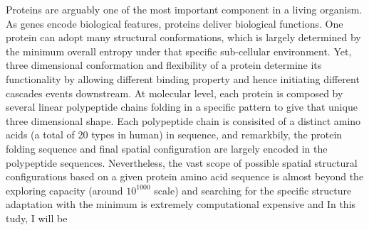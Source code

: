 Proteins are arguably one of the most important component in a living organism. As genes encode biological features, proteins deliver biological functions. One protein can adopt many structural conformations, which is largely determined by the minimum overall entropy under that specific sub-cellular environment. Yet, three dimensional conformation and flexibility of a protein determine its functionality by allowing different binding property and hence initiating different cascades events downstream. At molecular level, each protein is composed by several linear polypeptide chains folding in a specific pattern to give that unique three dimensional shape. Each polypeptide chain is consisited of a distinct amino acids (a total of 20 types in human) in sequence, and remarkbily, the protein folding sequence and final spatial configuration are largely encoded in the polypeptide sequences. Nevertheless, the vast scope of possible spatial structural configurations based on a given protein amino acid sequence is almost beyond the exploring capacity (around $10^{1000}$ scale) and searching for the specific structure adaptation with the minimum is extremely computational expensive and  In this tudy, I will be 